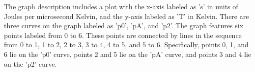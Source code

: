 The graph description includes a plot with the x-axis labeled as 's' in units of Joules per microsecond Kelvin, and the y-axis labeled as 'T' in Kelvin. There are three curves on the graph labeled as 'p0', 'pA', and 'p2'. The graph features six points labeled from 0 to 6. These points are connected by lines in the sequence from 0 to 1, 1 to 2, 2 to 3, 3 to 4, 4 to 5, and 5 to 6. Specifically, points 0, 1, and 6 lie on the 'p0' curve, points 2 and 5 lie on the 'pA' curve, and points 3 and 4 lie on the 'p2' curve.